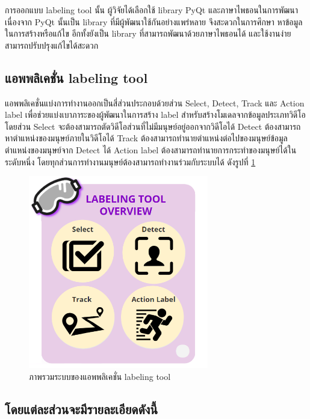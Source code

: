 การออกแบบ labeling tool นั้น ผู้วิจัยได้เลือกใช้ library PyQt และภาษาไพธอนในการพัฒนา
เนื่องจาก PyQt นั้นเป็น library ที่มีผู้พัฒนาใช้กันอย่างแพร่หลาย จึงสะดวกในการศึกษา หาข้อมูลในการสร้างหรือแก้ไข
อีกทั้งยังเป็น library ที่สามารถพัฒนาด้วยภาษาไพธอนได้ และใช้งานง่าย สามารถปรับปรุงแก้ไขได้สะดวก

\subsection{แอพพลิเคชั่น labeling tool}
แอพพลิเคชั่นแบ่งการทำงานออกเป็นสี่ส่วนประกอบด้วยส่วน Select, Detect, Track และ Action label
เพื่อช่วยแบ่งเบาภาระของผู้พัฒนาในการสร้าง label สำหรับสร้างโมเดลจากข้อมูลประเภทวิดีโอ โดยส่วน Select
จะต้องสามารถตัดวิดีโอส่วนที่ไม่มีมนุษย์อยู่ออกจากวิดีโอได้ Detect ต้องสามารถหาตำแหน่งของมนุษย์ภายในวิดีโอได้
Track ต้องสามารถทำนายตำแหน่งต่อไปของมนุษย์ข้อมูลตำแหน่งของมนุษย์จาก Detect ได้
Action label ต้องสามารถทำนายการกระทำของมนุษย์ได้ในระดับหนึ่ง โดยทุกส่วนการทำงานมนุษย์ต้องสามารถทำงานร่วมกับระบบได้
ดังรูปที่ \ref{fig:labeling_overview}

\begin{figure}[!ht]
    \centering
    \includegraphics[width=0.7\textwidth]{chapter3/images/3_6/labelingToolOverview.png}
    \caption{ภาพรวมระบบของแอพพลิเคชั่น labeling tool}
    \label{fig:labeling_overview}
\end{figure}
\clearpage

\subsection*{โดยแต่ละส่วนจะมีรายละเอียดดังนี้}
